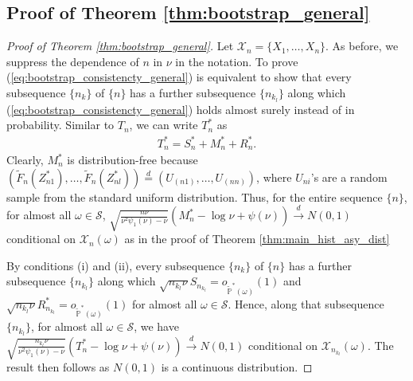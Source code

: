 \documentclass[12pt,letterpaper, twoside, openany]{article}
\theoremstyle{plain}
\begin{document}
\subsection{Proof of Theorem \ref{thm:bootstrap_general}}
\begin{proof}[Proof of Theorem \ref{thm:bootstrap_general}]
Let $\mathcal{X}_n = \{X_1,\ldots,X_n \}$. As before, we suppress the dependence of $n$ in $\nu$ in the notation. To prove (\ref{eq:bootstrap_consistencty_general})  is equivalent to show that every subsequence  $\{n_k\}$ of $\{n\}$ has a further subsequence $\{n_{k_l}\}$ along which (\ref{eq:bootstrap_consistencty_general}) holds almost surely instead of in probability.
Similar to $T_n$, we can write $T^*_n$ as 
\begin{eqnarray*}
T_n^* = S_n^* + M_n^* + R_n^*.
\end{eqnarray*}
Clearly, $M_n^*$ is distribution-free  because $( \tilde{F}_n(Z_{n1}^*),\ldots, \tilde{F}_n(Z_{nl}^*)) \stackrel{d}{=} (U_{(n1)},\ldots,U_{(nn)})$, where $U_{ni}$'s are a random sample from the standard uniform distribution. Thus, for the entire sequence $\{n\}$, for almost all $\omega \in \mathcal{S}$, $	\sqrt{ \frac{n\nu}{\nu^2\psi_1(\nu)-\nu}} \left( M_n^* -  \log \nu +  \psi(\nu) \right) \stackrel{d}{\rightarrow} N(0, 1)
$ conditional on $\mathcal{X}_n(\omega)$ as in the proof of Theorem \ref{thm:main_hist_asy_dist} 

By conditions (i) and (ii), every subsequence $\{n_k\}$ of $\{n\}$ has a further subsequence $\{n_{k_l}\}$ along which $\sqrt{n_{k_l} \nu}S_{n_{k_l} } = o_{\tilde{\mathbb{P}}^*(\omega)} \left(1 \right)$ and $\sqrt{n_{k_l}\nu} R_{n_{k_l}}^* = o_{\tilde{\mathbb{P}}^*(\omega)} \left(1\right)$ for almost all $\omega \in \mathcal{S}$. Hence, along that subsequence $\{n_{k_l}\}$, for almost all $\omega \in \mathcal{S}$,  we have $\sqrt{ \frac{n_{k_l}\nu}{\nu^2\psi_1(\nu)-\nu}} \left( T_n^* -  \log \nu +  \psi(\nu) \right) \stackrel{d}{\rightarrow} N(0, 1)$ conditional on $\mathcal{X}_{n_{k_l}}(\omega)$. The result then follows as $N(0, 1)$ is a continuous distribution.
\end{proof}
\end{document}
